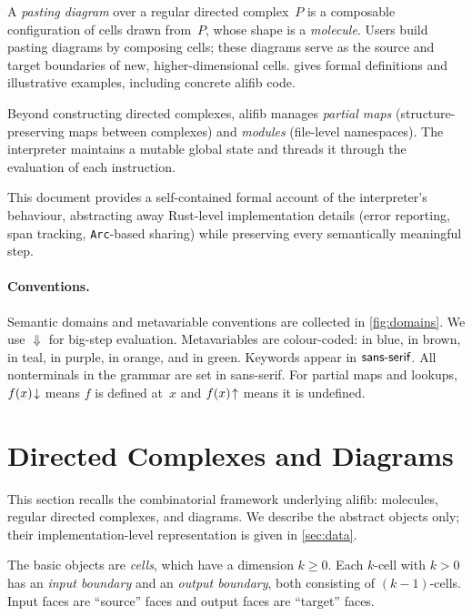\documentclass[acmsmall,screen,nonacm]{acmart}
\begin{document}
A \emph{pasting diagram} over a regular directed complex~$P$ is a
composable configuration of cells drawn from~$P$, whose shape is a
\emph{molecule}.  Users build pasting diagrams by composing cells;
these diagrams serve as the source and target boundaries of new,
higher-dimensional cells.   gives formal
definitions and illustrative examples, including concrete
\textsf{alifib} code.

Beyond constructing directed complexes, \textsf{alifib} manages
\emph{partial maps} (structure-preserving maps between complexes) and
\emph{modules} (file-level namespaces).  The interpreter maintains a
mutable global state and threads it through the evaluation of each
instruction.

This document provides a self-contained formal account of the
interpreter's behaviour, abstracting away Rust-level implementation
details (error reporting, span tracking, \texttt{Arc}-based sharing)
while preserving every semantically meaningful step.

\paragraph{Conventions.}
Semantic domains and metavariable conventions are collected in
\cref{fig:domains}.  We use $\Downarrow$ for big-step evaluation.
Metavariables are colour-coded:  in blue,
 in brown,  in teal,  in
purple,  in orange, and  in
green.  Keywords appear in $\mathsf{sans\text{-}serif}$.
All nonterminals in the grammar are set in \textsf{sans-serif}.
For partial maps and lookups, $f(x)\!\downarrow$ means $f$ is defined at~$x$
and $f(x)\!\uparrow$ means it is undefined.

\section{Directed Complexes and Diagrams}
\label{sec:molecules}

This section recalls the combinatorial framework underlying
\textsf{alifib}: molecules, regular directed complexes, and diagrams.
We describe the abstract objects only; their implementation-level
representation is given in \cref{sec:data}.

The basic objects are \emph{cells}, which have a dimension $k \geq 0$.
Each $k$-cell with $k > 0$ has an \emph{input boundary} and an
\emph{output boundary}, both consisting of $(k{-}1)$-cells.  Input
faces are ``source'' faces and output faces are ``target'' faces.
\end{document}
